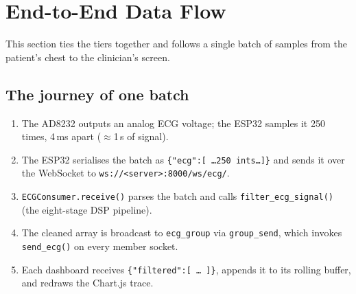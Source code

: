 \section{End-to-End Data Flow}

This section ties the tiers together and follows a single batch of samples from
the patient's chest to the clinician's screen.

\subsection{The journey of one batch}
\begin{enumerate}[noitemsep]
  \item The AD8232 outputs an analog ECG voltage; the ESP32 samples it 250 times,
        4\,ms apart ($\approx$1\,s of signal).
  \item The ESP32 serialises the batch as \texttt{\{"ecg":[\,\ldots 250 ints\ldots]\}}
        and sends it over the WebSocket to \texttt{ws://<server>:8000/ws/ecg/}.
  \item \texttt{ECGConsumer.receive()} parses the batch and calls
        \texttt{filter\_ecg\_signal()} (the eight-stage DSP pipeline).
  \item The cleaned array is broadcast to \texttt{ecg\_group} via
        \texttt{group\_send}, which invokes \texttt{send\_ecg()} on every member
        socket.
  \item Each dashboard receives \texttt{\{"filtered":[\,\ldots\,]\}}, appends it to
        its rolling buffer, and redraws the Chart.js trace.
\end{enumerate}

